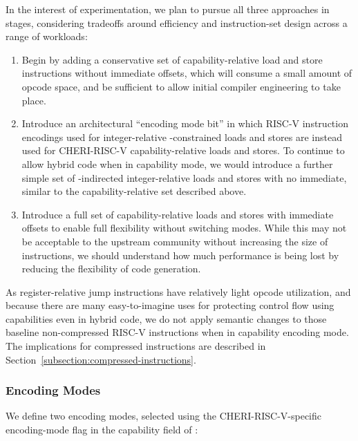 \noindent
In the interest of experimentation, we plan to pursue all three approaches
in stages, considering tradeoffs around efficiency and instruction-set design
across a range of workloads:

\begin{enumerate}
\item Begin by adding a conservative set of capability-relative load and store
instructions without immediate offsets, which will consume a small amount of
opcode space, and be sufficient to allow initial compiler engineering to take
place.

\item Introduce an architectural ``encoding mode bit'' in which RISC-V
instruction encodings used for integer-relative \DDC{}-constrained loads and
stores are instead used for CHERI-RISC-V capability-relative loads and stores.
To continue to allow hybrid code when in capability mode, we would introduce a
further simple set of \DDC{}-indirected integer-relative loads and stores with
no immediate, similar to the capability-relative set described above.

\item Introduce a full set of capability-relative loads and stores
with immediate offsets to enable full flexibility without switching modes.
While this may not be acceptable to the upstream community without increasing
the size of instructions, we should understand how much performance is being
lost by reducing the flexibility of code generation.
\end{enumerate}

As register-relative jump instructions have relatively light opcode
utilization, and because there are many easy-to-imagine uses for protecting
control flow using capabilities even in hybrid code, we do not apply semantic
changes to those baseline non-compressed RISC-V instructions when in
capability encoding mode.
The implications for compressed instructions are described in
Section~\ref{subsection:compressed-instructions}.

\subsubsection{Encoding Modes}
\label{sec:cheri-riscv-encmodes}

We define two encoding modes, selected using the CHERI-RISC-V-specific
encoding-mode flag in the capability \cflags{} field of \PCC{}:

